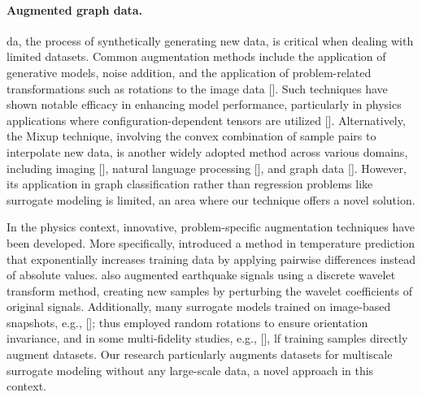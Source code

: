 \documentclass[12pt,a4paper]{report}
\begin{document}
\paragraph{Augmented graph data.} \ac{da}, the process of synthetically generating new data, is critical when dealing with limited datasets. Common augmentation methods include the application of generative models, noise addition, and the application of problem-related transformations such as rotations to the image data [\cite{mumuni2022}]. Such techniques have shown notable efficacy in enhancing model performance, particularly in physics applications where configuration-dependent tensors are utilized [\cite{cheung2023}]. Alternatively, the Mixup technique, involving the convex combination of sample pairs to interpolate new data, is another widely adopted method across various domains, including imaging [\cite{guo2019,zhang2018}], natural language processing [\cite{jindal2020,guo2020}], and graph data [\cite{han2022,wang2021}]. However, its application in graph classification rather than regression problems like surrogate modeling is limited, an area where our technique offers a novel solution.

In the physics context, innovative, problem-specific augmentation techniques have been developed. More specifically, \cite{zhao2021} introduced a method in temperature prediction that exponentially increases training data by applying pairwise differences instead of absolute values. \cite{parida2023a} also augmented earthquake signals using a discrete wavelet transform method, creating new samples by perturbing the wavelet coefficients of original signals. Additionally, many surrogate models trained on image-based snapshots, e.g., [\cite{dong2022}]; thus employed random rotations to ensure orientation invariance, and in some multi-fidelity studies, e.g., [\cite{sella2023}], \ac{lf} training samples directly augment datasets. Our research particularly augments datasets for multiscale surrogate modeling without any large-scale data, a novel approach in this context.
\end{document}
